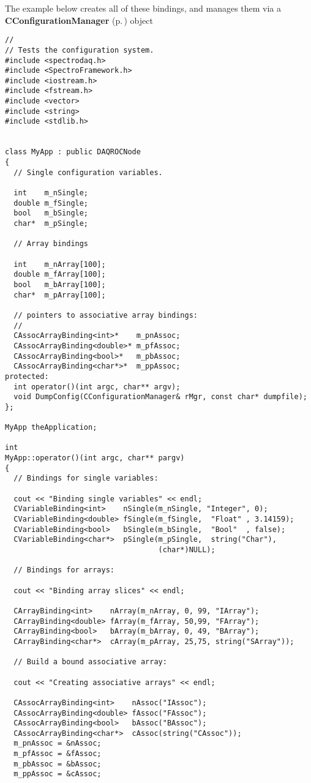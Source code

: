 The example below creates all of these bindings, and manages them via a  {\bf CConfiguration\-Manager} {\rm (p.\,\pageref{classCConfigurationManager})} object



\footnotesize\begin{verbatim}//
// Tests the configuration system.
#include <spectrodaq.h>
#include <SpectroFramework.h>
#include <iostream.h>
#include <fstream.h>
#include <vector>
#include <string>
#include <stdlib.h>


class MyApp : public DAQROCNode
{
  // Single configuration variables.

  int    m_nSingle;
  double m_fSingle;
  bool   m_bSingle;
  char*  m_pSingle;

  // Array bindings

  int    m_nArray[100];
  double m_fArray[100];
  bool   m_bArray[100];
  char*  m_pArray[100];

  // pointers to associative array bindings:
  //
  CAssocArrayBinding<int>*    m_pnAssoc;
  CAssocArrayBinding<double>* m_pfAssoc;
  CAssocArrayBinding<bool>*   m_pbAssoc;
  CAssocArrayBinding<char*>*  m_ppAssoc;  
protected:
  int operator()(int argc, char** argv);
  void DumpConfig(CConfigurationManager& rMgr, const char* dumpfile);
};

MyApp theApplication;

int
MyApp::operator()(int argc, char** pargv)
{
  // Bindings for single variables:

  cout << "Binding single variables" << endl;
  CVariableBinding<int>    nSingle(m_nSingle, "Integer", 0);
  CVariableBinding<double> fSingle(m_fSingle,  "Float" , 3.14159);
  CVariableBinding<bool>   bSingle(m_bSingle,  "Bool"  , false);
  CVariableBinding<char*>  pSingle(m_pSingle,  string("Char"), 
                                   (char*)NULL);

  // Bindings for arrays:

  cout << "Binding array slices" << endl;

  CArrayBinding<int>    nArray(m_nArray, 0, 99, "IArray");
  CArrayBinding<double> fArray(m_fArray, 50,99, "FArray");
  CArrayBinding<bool>   bArray(m_bArray, 0, 49, "BArray");
  CArrayBinding<char*>  cArray(m_pArray, 25,75, string("SArray"));

  // Build a bound associative array:

  cout << "Creating associative arrays" << endl;

  CAssocArrayBinding<int>    nAssoc("IAssoc");
  CAssocArrayBinding<double> fAssoc("FAssoc");
  CAssocArrayBinding<bool>   bAssoc("BAssoc");
  CAssocArrayBinding<char*>  cAssoc(string("CAssoc"));
  m_pnAssoc = &nAssoc;
  m_pfAssoc = &fAssoc;
  m_pbAssoc = &bAssoc;
  m_ppAssoc = &cAssoc;


\end{verbatim}
